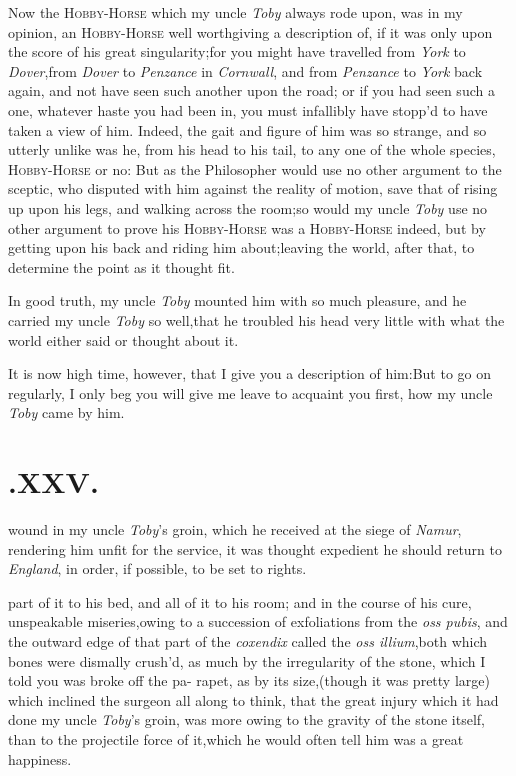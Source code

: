 \documentclass{article}
\begin{document}
Now the \textsc{Hobby-Horse} which my uncle \textit{Toby} always rode
upon, was in my opinion, an \textsc{Hobby-Horse} well worth\break giving
a description of, if it was only upon the score of his great
singularity;\break for you might have travelled from \textit{York} to
\textit{Dover},\tsk  from \textit{Dover} to \textit{Penzance} in
\textit{Cornwall}, and from \textit{Penzance} to \textit{York} back
again, and not have seen such another upon the road; or if you had seen
such a one, whatever haste you had been in, you must infallibly have
stopp’d to have taken a view of him. Indeed, the gait and figure of him
was so strange, and so utterly unlike was he, from his head to his tail,
to any one of the whole species, 
\textsc{Hobby-Horse} or no: But as the Philo\-so\-pher would use no other
argument to the sceptic, who disputed with him against the reality of
motion, save that of rising up upon his legs, and walking across the
room;\tsk  so would my uncle \textit{Toby} use no other argument to
prove his \textsc{Hobby-Horse} was a \textsc{Hobby-Horse} indeed, but by
getting upon his back and riding him about;\tsk  leaving the world,
after that, to determine the point as it thought fit.

In good truth, my uncle \textit{Toby} mounted him with so much
pleasure, and he carried my uncle \textit{Toby} so
well,\tsh  that he troubled his head very little with what
the world either said or thought about it.

It is now high time, however, that I give you a description of
him:\tsk  But to go on regularly, I only beg you will give me
leave to acquaint you first, how my uncle \textit{Toby} came by
him.

\null
\section{.\enspace XXV.}

 wound in my uncle \textit{Toby}’s\break
groin, which he received at the\break
siege of \textit{Namur}, rendering him unfit for the
service, it was thought expedient he should return
to \textit{England}, in order, if possible, to be
set to rights.

\noindent
{}
part of it to his bed, and all of it to his room; and in the
course of his cure,\break{}
unspeakable miseries,\tsk  owing to a succession of exfoliations
from the \textit{oss pubis}, and the outward edge of that part of
the \textit{coxendix} called the \textit{oss illium},\tsh  both
which bones were dismally crush’d, as much by the irregularity
of the stone, which I told you was broke off the pa-
rapet,\tsk
as by its size,\tsk  (though it was pretty large) which inclined
the surgeon all along to think, that the great injury which it
had done my uncle \textit{Toby}’s groin, was more owing to the
gravity of the stone itself, than to the projectile force of
it,\tsk  which he would often tell him was a great happiness.
\end{document}
